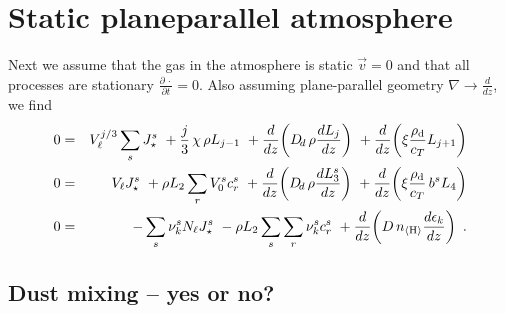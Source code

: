 \documentclass[11pt]{article}
\def\nH{n_{\langle\rm H\rangle}}
\def\Vl{V_{\ell}}
\def\Nl{N_{\ell}}
\def\rhod{\rho_{\rm d}}
\def\ek{\epsilon_k}
\def\pdiff#1#2{\frac{\partial #1}{\partial #2}}
\def\Dd{D_{\!d}}
\begin{document}
\section{Static planeparallel atmosphere}

Next we assume that the gas in the atmosphere is static $\vec{v}=0$ 
and that all processes are stationary $\pdiff{\,\cdot}{t}=0$. Also
assuming plane-parallel geometry $\nabla\to\frac{d}{dz}$, 
we find
\begin{eqnarray}
 0 &=& \Vl^{j/3} \sum\limits_s J_\star^s
    ~+ \frac{j}{3}\,\chi\,\rho L_{j-1}
    ~+ \frac{d}{dz}\!\left(\Dd\,\rho\frac{d L_j}{dz}\right)
    ~+ \frac{d}{dz}\!\left(\xi\frac{\rhod}{c_T}L_{j+1}\right) \\
 0 &=& \Vl J_\star^s 
    ~+ \rho L_2 \sum\limits_r V_0^s c_r^s  
    ~+ \frac{d}{dz}\!\left(\Dd\,\rho \frac{dL_3^s}{dz}\right)
    ~+ \frac{d}{dz}\!\left(\xi\frac{\rhod}{c_T}\,b^s L_4\right)\\
 0 &=& -\sum\limits_s \nu_k^s \Nl J_\star^s 
    ~- \rho L_2 \sum\limits_s\sum\limits_r \nu_k^s c_r^s 
    ~+ \frac{d}{dz}\!\left(D\,\nH\frac{d\ek}{dz}\right)  \ .
\end{eqnarray}

\subsection{Dust mixing -- yes or no?}
\end{document}
